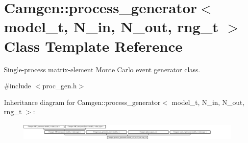 \hypertarget{a00436}{}\section{Camgen\+:\+:process\+\_\+generator$<$ model\+\_\+t, N\+\_\+in, N\+\_\+out, rng\+\_\+t $>$ Class Template Reference}
\label{a00436}


Single-\/process matrix-\/element Monte Carlo event generator class.  




{\ttfamily \#include $<$proc\+\_\+gen.\+h$>$}

Inheritance diagram for Camgen\+:\+:process\+\_\+generator$<$ model\+\_\+t, N\+\_\+in, N\+\_\+out, rng\+\_\+t $>$\+:\begin{figure}[H]
\begin{center}
\leavevmode
\includegraphics[height=0.930748cm]{a00436}
\end{center}
\end{figure}
